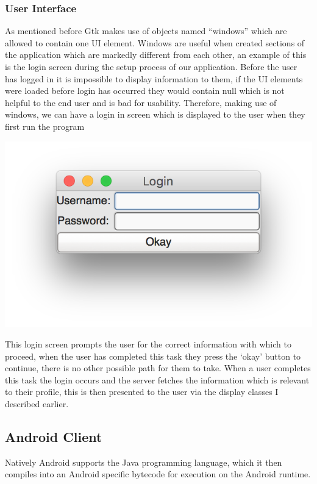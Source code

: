 \documentclass{article}
\begin{document}
\subsubsection{User Interface}
As mentioned before Gtk makes use of objects named “windows” which are allowed to contain one UI element. Windows are useful when created sections of the application which are markedly different from each other, an example of this is the login screen during the setup process of our application. Before the user has logged in it is impossible to display information to them, if the UI elements were loaded before login has occurred they would contain null which is not helpful to the end user and is bad for usability. Therefore, making use of windows, we can have a login in screen which is displayed to the user when they first run the program 
\begin{center}
\includegraphics[scale=1]{gtk1.png}
\end{center}
This login screen prompts the user for the correct information with which to proceed, when the user has completed this task they press the ‘okay’ button to continue, there is no other possible path for them to take. When a user completes this task the login occurs and the server fetches the information which is relevant to their profile, this is then presented to the user via the display classes I described earlier.

\subsection{Android Client }

Natively Android supports the Java programming language, which it then compiles into an Android specific bytecode for execution on the Android runtime. 
\end{document}
